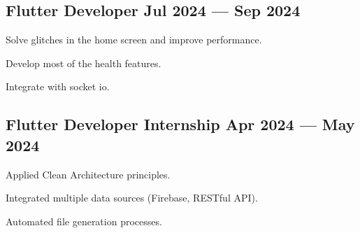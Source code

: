 \subsection{{Flutter Developer \hfill Jul 2024 --- Sep 2024}}
\begin{zitemize}
\item Solve glitches in the home screen and improve performance.
\item Develop most of the health features.
\item Integrate with socket io.
\end{zitemize}

\subsection{{Flutter Developer Internship \hfill Apr 2024 --- May 2024}}
\begin{zitemize}
\item Applied Clean Architecture principles.
\item Integrated multiple data sources (Firebase, RESTful API).
\item Automated file generation processes.
\end{zitemize}
